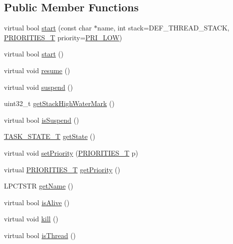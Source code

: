 \subsection*{Public Member Functions}
\begin{DoxyCompactItemize}
\item 
virtual bool \hyperlink{class_c_thread_a3ebabcc071634508511ae2fc7b868ab7}{start} (const char $\ast$name, int stack=D\-E\-F\-\_\-\-T\-H\-R\-E\-A\-D\-\_\-\-S\-T\-A\-C\-K, \hyperlink{group___r_t_o_s_ga51e24e4c0498282f564e92975e020c1d}{P\-R\-I\-O\-R\-I\-T\-I\-E\-S\-\_\-\-T} priority=\hyperlink{group___r_t_o_s_gga51e24e4c0498282f564e92975e020c1daf8a2513dc9a78bb09c0520af65a3f402}{P\-R\-I\-\_\-\-L\-O\-W})
\item 
virtual bool \hyperlink{class_c_thread_aacf955d1852e74da1f989251955ee6ec}{start} ()
\item 
virtual void \hyperlink{class_c_thread_ac8c53aa8c145fc4ac70fa6d825b95742}{resume} ()
\item 
virtual void \hyperlink{class_c_thread_a53e71e6db2221cd1c45aec21953d4aad}{suspend} ()
\item 
uint32\-\_\-t \hyperlink{class_c_thread_ac0227eda51725b795a461a768703f588}{get\-Stack\-High\-Water\-Mark} ()
\item 
virtual bool \hyperlink{class_c_thread_a51dbe9909ce528b4113d2cc27314e965}{is\-Suspend} ()
\item 
\hyperlink{group___r_t_o_s_ga25ee4013cc565a18ac2f4039b4ad441b}{T\-A\-S\-K\-\_\-\-S\-T\-A\-T\-E\-\_\-\-T} \hyperlink{class_c_thread_a1e9cce461d8dfb3889cea24f1a703f6f}{get\-State} ()
\item 
virtual void \hyperlink{class_c_thread_a6b0703ae0cc085a0c0aaa55b6945575b}{set\-Priority} (\hyperlink{group___r_t_o_s_ga51e24e4c0498282f564e92975e020c1d}{P\-R\-I\-O\-R\-I\-T\-I\-E\-S\-\_\-\-T} p)
\item 
virtual \hyperlink{group___r_t_o_s_ga51e24e4c0498282f564e92975e020c1d}{P\-R\-I\-O\-R\-I\-T\-I\-E\-S\-\_\-\-T} \hyperlink{class_c_thread_ac30b0a1f51549a97b88771692319c0e4}{get\-Priority} ()
\item 
L\-P\-C\-T\-S\-T\-R \hyperlink{class_c_thread_aa291909bc3ff7cc0decf46c885a7a725}{get\-Name} ()
\item 
virtual bool \hyperlink{class_c_thread_a4a0f0727be4714cef1e24150a869d403}{is\-Alive} ()
\item 
virtual void \hyperlink{class_c_thread_a15041136818470124d097d790d55a6e5}{kill} ()
\item 
virtual bool \hyperlink{class_c_thread_ab2513fd0fcad30e2e6605609c91f1984}{is\-Thread} ()
\end{DoxyCompactItemize}
